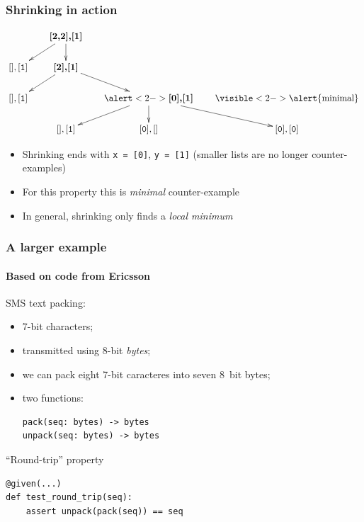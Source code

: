 \documentclass{beamer}
\newcommand{\counter}[1]{\textbf{#1}}
\newcommand{\noncounter}[1]{{\mathtt{#1}}}
\begin{document}
\begin{frame}
\frametitle{Shrinking in action}

\[ \xymatrix@-0.5pc{
 & \counter{[2,2],[1]}\ar[dl]\ar[d] \\
 \noncounter{[],[1]} &  \counter{[2],[1]}\ar[dl]\ar[dr] \\
 \noncounter{[],[1]} & &\alert<2->{\counter{[0],[1]}}\ar[dl]\ar[d]\ar[dr]
 &  \visible<2->{\alert{\text{minimal}}} \\
&  \noncounter{[],[1]} & \noncounter{[0],[]} & \noncounter{[0],[0]}
} 
\]

\begin{itemize}
\item Shrinking ends with  \texttt{x = [0]}, \texttt{y = [1]}
  (smaller lists are no longer counter-examples)
\item For this property this is \emph{minimal} counter-example
\item In general, shrinking only finds a \emph{local minimum}
\end{itemize}
\end{frame}


\begin{frame}[fragile]
\frametitle{A larger example}
\framesubtitle{Based on code from Ericsson}

SMS text packing:
\begin{itemize}
\item 7-bit characters;
\item transmitted using 8-bit \emph{bytes};
\item we can pack eight 7-bit caracteres into seven 8~bit bytes;
\item two functions:
\begin{verbatim}
pack(seq: bytes) -> bytes
unpack(seq: bytes) -> bytes
\end{verbatim} 
\end{itemize}

\begin{block}{``Round-trip'' property}
\begin{verbatim}
@given(...)
def test_round_trip(seq):
    assert unpack(pack(seq)) == seq
\end{verbatim}
\end{block}
\end{frame}
\end{document}
